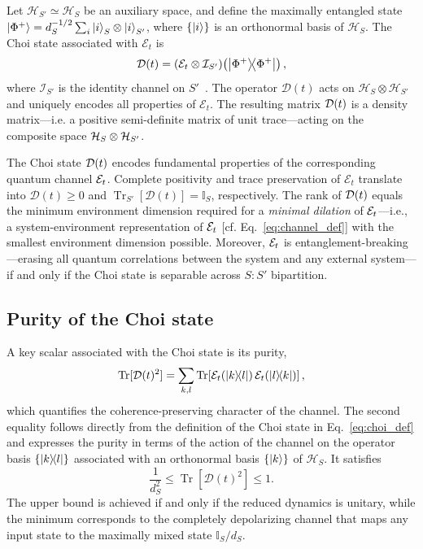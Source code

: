 \documentclass[pra,twocolumn,aps,showpacs,superscriptaddress,longbibliography]{revtex4-2}
\begin{document}
Let $\mathcal{H}_{S'}\simeq\mathcal{H}_S$ be an auxiliary space, and define the maximally entangled state $\ket{\Phi^+}=d_S^{-1/2}\sum_i \ket{i}_S\otimes\ket{i}_{S'}$, where $\{\ket{i}\}$ is an orthonormal basis of $\mathcal{H}_S$. The Choi state associated with $\mathcal{E}_t$ is
\begin{equation}\label{eq:choi_def}
\mathcal{D}(t)=(\mathcal{E}_t\otimes\mathcal{I}_{S'})\!\left(\dyad{\Phi^+}\right),
\end{equation}
where $\mathcal{I}_{S'}$ is the identity channel on $S'$~\cite{bengtsson_2006_geometry}. The operator $\mathcal{D}(t)$ acts on $\mathcal{H}_S\otimes\mathcal{H}_{S'}$ and uniquely encodes all properties of $\mathcal{E}_t$. The resulting matrix $\mathcal{D}(t)$ is a density matrix---i.e. a positive semi-definite matrix of unit trace---acting on the composite space $\mathcal{H}_S \otimes \mathcal{H}_{S'}$.

The Choi state $\mathcal{D}(t)$ encodes fundamental properties of the corresponding quantum channel $\mathcal{E}_t$. 
Complete positivity and trace preservation of $\mathcal{E}_t$ translate into $\mathcal{D}(t)\ge0$ and $\operatorname{Tr}_{S'}[\mathcal{D}(t)]=\mathbb{I}_S$, respectively. 
The rank of $\mathcal{D}(t)$ equals the minimum environment dimension required for a \textit{minimal dilation} of $\mathcal{E}_t$---i.e., a system-environment representation of $\mathcal{E}_t$  [cf. Eq.~\eqref{eq:channel_def}] with the smallest environment dimension possible. Moreover, $\mathcal{E}_t$ is entanglement-breaking---erasing all quantum correlations between the system and any external system---if and only if the Choi state is separable across $S{:}S'$ bipartition.


\subsection{Purity of the Choi state}
A key scalar associated with the Choi state is its purity,
\begin{equation}\label{eq:choi:purity}
\operatorname{Tr}[\mathcal{D}(t)^2]
= \sum_{k,l}\operatorname{Tr}\!\left[\mathcal{E}_t(\dyad{k}{l})\,\mathcal{E}_t(\dyad{l}{k})\right],
\end{equation}
which quantifies the coherence-preserving character of the channel. The second equality follows directly from the definition of the Choi state in Eq.~\eqref{eq:choi_def} and expresses the purity in terms of the action of the channel on the operator basis \(\{\dyad{k}{l}\}\) associated with an orthonormal basis \(\{\ket{k}\}\) of \(\mathcal{H}_S\). It satisfies
\[
\frac{1}{d_S^2}\le\operatorname{Tr}[\mathcal{D}(t)^2]\le 1.
\]
The upper bound is achieved if and only if the reduced dynamics is unitary, while the minimum corresponds to the completely depolarizing channel that maps any input state to the maximally mixed state $\mathbb{I}_S/d_S$.
\end{document}
